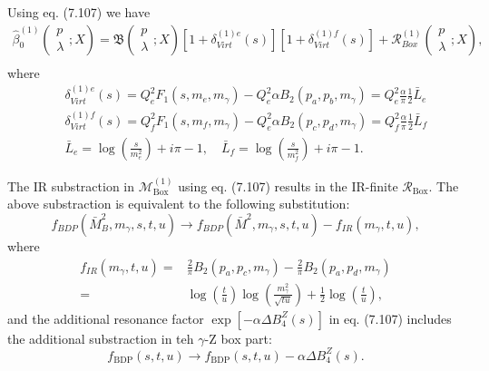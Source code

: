 Using eq. (7.107) we have
\begin{eqnarray}
\hat{\beta}_0^{(1)}\left(\begin{array}{c}
p\\\lambda
\end{array};X\right)=\mathfrak{B}\left(\begin{array}{c}
	p\\\lambda
	\end{array};X\right)[1+\delta^{(1)e}_{Virt}(s)][1+\delta^{(1)f}_{Virt}(s)]+\mathcal{R}_{Box}^{(1)}\left(\begin{array}{c}
	p\\\lambda
	\end{array};X\right),\nonumber\\
\end{eqnarray}
where
\begin{eqnarray}
&&\delta^{(1)e}_{Virt}(s)=Q^2_eF_1(s,m_e,m_\gamma)-Q^2_e\alpha B_2(p_a,p_b,m_\gamma)=Q^2_e\frac{\alpha}{\pi}\frac{1}{2}\bar{L}_e\nonumber\\
&&\delta^{(1)f}_{Virt}(s)=Q^2_fF_1(s,m_f,m_\gamma)-Q^2_e\alpha B_2(p_c,p_d,m_\gamma)=Q^2_f\frac{\alpha}{\pi}\frac{1}{2}\bar{L}_f\nonumber\\
&&\bar{L}_e=\log\left(\frac{s}{m_e^2}\right)+i\pi-1,\quad \bar{L}_f=\log\left(\frac{s}{m_f^2}\right)+i\pi-1.
\end{eqnarray}

The IR substraction in $\mathcal{M}_\text{Box}^{(1)}$ using eq. (7.107) results in the IR-finite $\mathcal{R}_\text{Box}$. The above substraction is equivalent to the following substitution:
\begin{equation}
f_{BDP}(\bar{M}^2_B,m_\gamma,s,t,u)\to f_{BDP}(\bar{M}^2,m_\gamma,s,t,u)-f_{IR}(m_\gamma,t,u),
\end{equation}
where
\begin{align}
f_{IR}(m_\gamma,t,u)=&\frac{2}{\pi}B_2(p_a,p_c,m_\gamma)-\frac{2}{\pi}B_2(p_a,p_d,m_\gamma)\nonumber\\
=&\log\left(\frac{t}{u}\right)\log\left(\frac{m^2_\gamma}{\sqrt{tu}}\right)+\frac{1}{2}\log\left(\frac{t}{u}\right),
\end{align}
and the additional resonance factor $\exp[-\alpha\Delta B^Z_4(s)]$ in eq. (7.107) includes the additional substraction in teh $\gamma$-Z box part:
\begin{equation}
f_\text{BDP}(s,t,u)\to f_\text{BDP}(s,t,u)-\alpha\Delta B_4^Z(s).
\end{equation}

